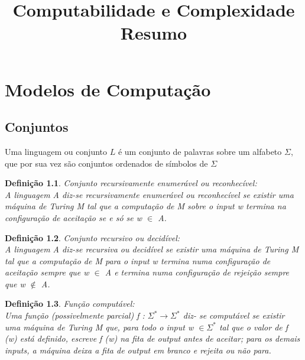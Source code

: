 \documentclass[10pt,a4paper]{report}
\title{\LARGE{Computabilidade e Complexidade} \\ \vspace{0.5cm} \normalsize{Resumo}}
\date{}
\newtheorem{definition}{Definição}
\begin{document}
\maketitle
\tableofcontents

\chapter{Modelos de Computação}
\section{Conjuntos}
Uma linguagem ou conjunto $L$ é um conjunto de palavras sobre um alfabeto $\Sigma$, que por sua vez são conjuntos ordenados de símbolos de $\Sigma$
\begin{definition}
Conjunto recursivamente enumerável ou reconhecível:\\
A linguagem A diz-se recursivamente enumerável ou reconhecível se existir uma máquina de Turing M tal que a
computação de M sobre o input w termina na configuração de aceitação se e só se w $\in$ A.
\end{definition}
\begin{definition}
Conjunto recursivo ou decidível:\\
A linguagem A diz-se recursiva ou decidível se existir uma
máquina de Turing M tal que a computação de M para
o input w termina numa configuração de aceitação sempre
que w $\in$ A e termina numa configuração de rejeição sempre que w $\notin$ A.
\end{definition}
\begin{definition}
Função computável:\\
Uma função (possivelmente parcial) f : $\Sigma^* \rightarrow \Sigma^*$ diz-
se computável se existir uma máquina de Turing M que,
para todo o input w $\in \Sigma^*$ tal que o valor de f (w) está definido, escreve f (w) na fita de output antes de aceitar; para os demais inputs, a máquina deixa a fita de output em branco e rejeita ou não para.
\end{definition}
\end{document}
